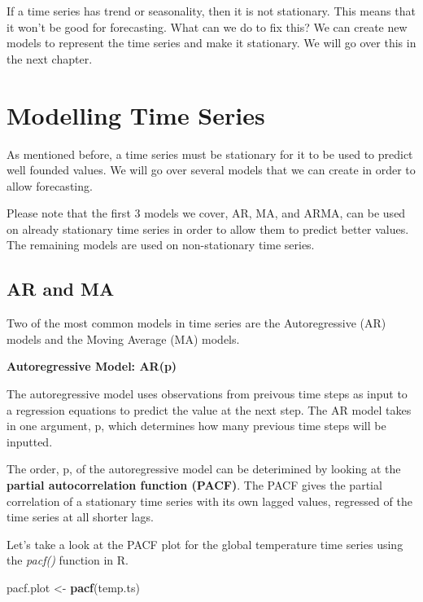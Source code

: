 \documentclass[
]{book}
\newenvironment{Shaded}{\begin{snugshade}}{\end{snugshade}}
\newcommand{\KeywordTok}[1]{\textcolor[rgb]{0.13,0.29,0.53}{\textbf{#1}}}
\newcommand{\NormalTok}[1]{#1}
\newcommand{\StringTok}[1]{\textcolor[rgb]{0.31,0.60,0.02}{#1}}
\begin{document}
If a time series has trend or seasonality, then it is not stationary. This means that it won't be good for forecasting. What can we do to fix this? We can create new models to represent the time series and make it stationary. We will go over this in the next chapter.

\hypertarget{modelling-time-series}{%
\chapter{Modelling Time Series}\label{modelling-time-series}}

As mentioned before, a time series must be stationary for it to be used to predict well founded values. We will go over several models that we can create in order to allow forecasting.

Please note that the first 3 models we cover, AR, MA, and ARMA, can be used on already stationary time series in order to allow them to predict better values. The remaining models are used on non-stationary time series.

\hypertarget{ar-and-ma}{%
\section{AR and MA}\label{ar-and-ma}}

Two of the most common models in time series are the Autoregressive (AR) models and the Moving Average (MA) models.

\textbf{Autoregressive Model: AR(p)}

The autoregressive model uses observations from preivous time steps as input to a regression equations to predict the value at the next step. The AR model takes in one argument, p, which determines how many previous time steps will be inputted.

The order, p, of the autoregressive model can be deterimined by looking at the \textbf{partial autocorrelation function (PACF)}. The PACF gives the partial correlation of a stationary time series with its own lagged values, regressed of the time series at all shorter lags.

Let's take a look at the PACF plot for the global temperature time series using the \emph{pacf()} function in R.

\begin{Shaded}
\begin{Highlighting}[]
\NormalTok{pacf.plot <-}\StringTok{ }\KeywordTok{pacf}\NormalTok{(temp.ts)}
\end{Highlighting}
\end{Shaded}
\end{document}
